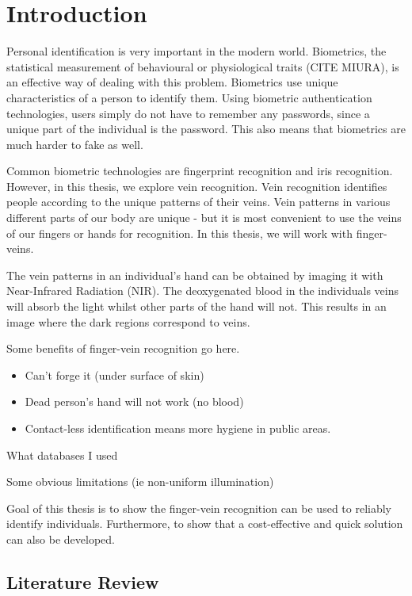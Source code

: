 \chapter{Introduction}

Personal identification is very important in the modern world. Biometrics, the statistical measurement of behavioural or physiological traits (CITE MIURA), is an effective way of dealing with this problem. Biometrics use unique characteristics of a person to identify them. Using biometric authentication technologies, users simply do not have to remember any passwords, since a unique part of the individual is the password. This also means that biometrics are much harder to fake as well.
\par
Common biometric technologies are fingerprint recognition and iris recognition. However, in this thesis, we explore vein recognition. Vein recognition identifies people according to the unique patterns of their veins. Vein patterns in various different parts of our body are unique \cite{jain2007handbook} - but it is most convenient to use the veins of our fingers or hands for recognition. In this thesis, we will work with finger-veins.
\par
The vein patterns in an individual's hand can be obtained by imaging it with Near-Infrared Radiation (NIR). The deoxygenated blood in the individuals veins will absorb the light whilst other parts of the hand will not. This results in an image where the dark regions correspond to veins. 
\par
Some benefits of finger-vein recognition go here.
\begin{itemize}
\item Can't forge it (under surface of skin)
\item Dead person's hand will not work (no blood)
\item Contact-less identification means more hygiene in public areas. 
\end{itemize}
\par
What databases I used
\par
Some obvious limitations (ie non-uniform illumination)
\par
Goal of this thesis is to show the finger-vein recognition can be used to reliably identify individuals. Furthermore, to show that a cost-effective and quick solution can also be developed. 

\section{Literature Review}

